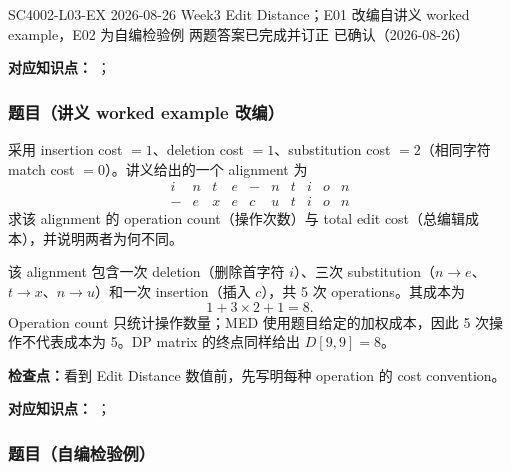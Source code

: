 

\examplemeta
  {SC4002-L03-EX}
  {2026-08-26}
  {Week3 Edit Distance；E01 改编自讲义 worked example，E02 为自编检验例}
  {两题答案已完成并订正}
  {已确认（2026-08-26）}


\textbf{对应知识点：}
；

\subsubsection*{题目（讲义 worked example 改编）}

采用 insertion cost $=1$、deletion cost $=1$、substitution cost $=2$（相同字符 match cost $=0$）。讲义给出的一个 alignment 为
\[
\begin{array}{cccccccccc}
 i&n&t&e&-&n&t&i&o&n\\
 -&e&x&e&c&u&t&i&o&n
\end{array}
\]
求该 alignment 的 operation count（操作次数）与 total edit cost（总编辑成本），并说明两者为何不同。

\begin{workedsolution}
该 alignment 包含一次 deletion（删除首字符 $i$）、三次 substitution（$n\to e$、$t\to x$、$n\to u$）和一次 insertion（插入 $c$），共 5 次 operations。其成本为
\[
  1+3\times2+1=8.
\]
Operation count 只统计操作数量；MED 使用题目给定的加权成本，因此 5 次操作不代表成本为 5。DP matrix 的终点同样给出 $D[9,9]=8$。
\end{workedsolution}

\textbf{检查点：}看到 Edit Distance 数值前，先写明每种 operation 的 cost convention。


\textbf{对应知识点：}
；

\subsubsection*{题目（自编检验例）}

